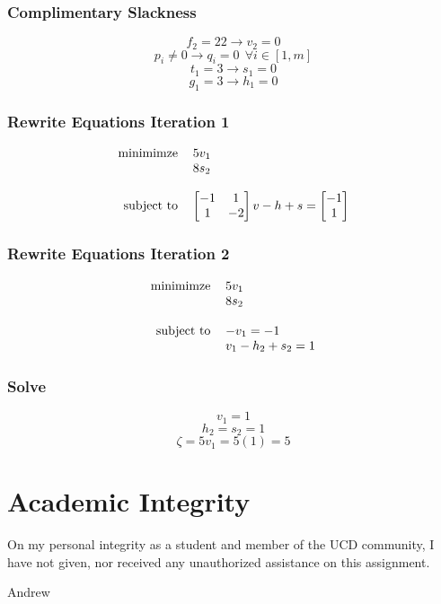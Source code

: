 \documentclass[14pt]{extarticle}
\begin{document}
\subsubsection*{Complimentary Slackness}
\[f_2 = 22 \to v_2 = 0\]
\[p_i \neq 0 \to q_i = 0 \ \ \forall i \in [1, m]\]
\[t_1 = 3 \to s_1 = 0\]
\[g_1 = 3 \to h_1 = 0\]

\subsubsection*{Rewrite Equations Iteration 1}
\[\begin{tabular}{r l}
    minimimze & $5v_1$ \\
    & $8s_2$ \\
    \\
    subject to & $\begin{bmatrix}
        -1 & 1 \\
        1 & -2 \\
    \end{bmatrix}v-h+s=\begin{bmatrix}
        -1 \\
        1 \\
    \end{bmatrix}$
\end{tabular}\]

\subsubsection*{Rewrite Equations Iteration 2}
\[\begin{tabular}{r l}
    minimimze & $5v_1$ \\
    & $8s_2$ \\
    \\
    subject to & $-v_1 = -1$ \\
    & $v_1 - h_2 + s_2 = 1$ \\
\end{tabular}\]

\subsubsection*{Solve}
\[v_1 = 1\]
\[h_2 = s_2 = 1\]
\[\zeta = 5v_1 = 5(1) = 5\]

\section*{Academic Integrity}
On my personal integrity as a student and member of the UCD community, I have not given, nor received any unauthorized assistance on this assignment.

\bigskip Andrew
\end{document}
